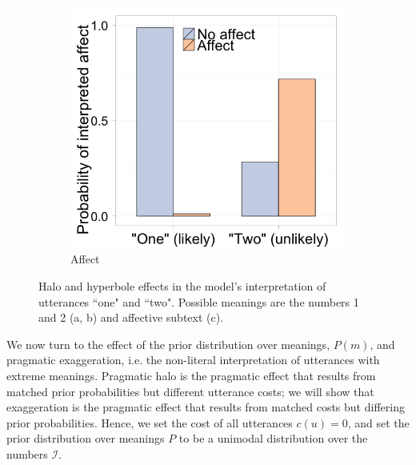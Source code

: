 \documentclass{article} %
\begin{document}
\begin{figure}[t]
\begin{subfigure}[t]{0.33\textwidth}
	\end{subfigure}
	\begin{subfigure}[t]{0.33\textwidth}
                \centering
                \caption{Affect}
                \includegraphics[width=\textwidth]{model_valence.png}
		
	\end{subfigure}
	\caption{Halo and hyperbole effects in the model's interpretation of utterances ``one" and ``two". Possible meanings are the numbers 1 and 2 (a, b) and affective subtext (c).}
	\label{fig:model}
\end{figure}

We now turn to the effect of the prior distribution over meanings, $P(m)$, and pragmatic exaggeration, i.e. the non-literal interpretation of utterances with extreme meanings. 
Pragmatic halo is the pragmatic effect that results from matched prior probabilities but different utterance costs; we will show that exaggeration is the pragmatic effect that results from matched costs but differing prior probabilities. 
Hence, we set the cost of all utterances $c(u)=0$, and set the prior distribution over meanings $P$ to be a unimodal distribution over the numbers $\mathcal I$. 
\end{document}
